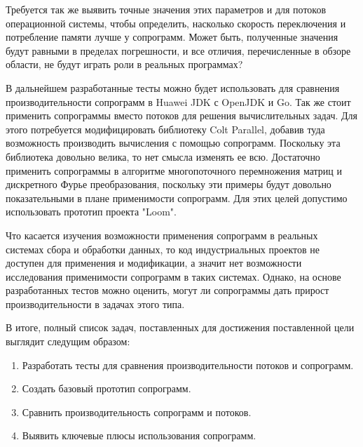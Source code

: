 	Требуется так же выявить точные значения этих параметров и для потоков операционной
	системы, чтобы определить, насколько скорость переключения и потребление памяти лучше
	у сопрограмм. Может быть, полученные значения будут равными в пределах погрешности,
	и все отличия, перечисленные в обзоре области, не будут играть роли в реальных программах?
	\par
	В дальнейшем разработанные тесты можно будет использовать для сравнения производительности сопрограмм в
	Huawei JDK с OpenJDK и Go. Так же стоит применить сопрограммы вместо потоков для решения вычислительных задач.
	Для этого потребуется модифицировать библиотеку Colt Parallel, добавив туда возможность производить
	вычисления с помощью сопрограмм. Поскольку эта библиотека довольно велика, то нет смысла
	изменять ее всю. Достаточно применить сопрограммы в алгоритме многопоточного перемножения
	матриц и дискретного Фурье преобразования, поскольку эти примеры будут довольно показательными в плане
	применимости сопрограмм. Для этих целей допустимо использовать прототип проекта "Loom".
	\par
	Что касается изучения возможности применения сопрограмм в реальных системах сбора и обработки данных,
	то код индустриальных проектов не доступен для применения и модификации, а значит нет возможности
	исследования применимости сопрограмм в таких системах. Однако, на основе разработанных тестов
	можно оценить, могут ли сопрограммы дать прирост производительности в задачах этого типа. 
	  
	В итоге, полный список задач, поставленных для достижения поставленной цели выглядит следущим образом:
	\begin{enumerate}[align=left]
	  	\item Разработать тесты для сравнения производительности потоков и сопрограмм.
	  	\item Создать базовый прототип сопрограмм.
	  	\item Сравнить производительность сопрограмм и потоков.
	  	\item Выявить ключевые плюсы использования сопрограмм.
	\end{enumerate}
\clearpage